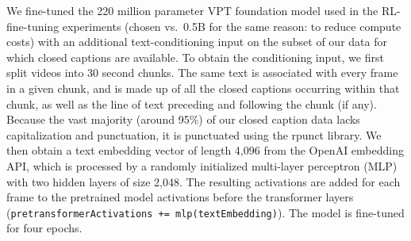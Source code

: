 We fine-tuned the 220 million parameter VPT foundation model used in the RL-fine-tuning experiments  (chosen vs.\ 0.5B for the same reason: to reduce compute costs) 
with an additional text-conditioning input on the subset of our data for which closed captions are available. To obtain the conditioning input, we first split videos into 30 second chunks. The same text is associated with every frame in a given chunk, and is made up of all the closed captions occurring within that chunk, as well as the line of text preceding and following the chunk (if any). Because the vast majority (around 95\%) of our closed caption data lacks capitalization and punctuation, it is punctuated using the rpunct library\cite{Daulet2021rpunct}. We then obtain a text embedding vector of length 4,096 from the OpenAI embedding API\cite{neelakantan2022text}, which is processed by a randomly initialized multi-layer perceptron (MLP) with two hidden layers of size 2,048. The resulting activations are added for each frame to the pretrained model activations before the transformer layers (\texttt{pretransformerActivations += mlp(textEmbedding)}).
The model is fine-tuned for four epochs.

